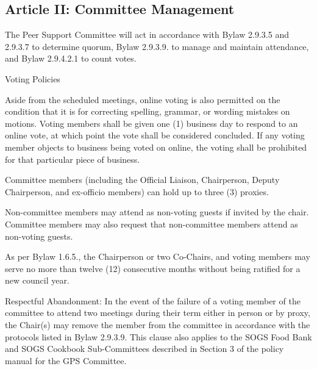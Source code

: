 \subsection{Article II: Committee Management}
\begin{longenum}[ label*=\thesubsection.\arabic*., align=left] 		
	\item The Peer Support Committee will act in accordance with Bylaw 2.9.3.5 and 2.9.3.7 to determine quorum, Bylaw 2.9.3.9. to manage and maintain attendance, and Bylaw 2.9.4.2.1 to count votes.
	\item Voting Policies
		\begin{longenum}[label*=\arabic*., align=left]
		\item Aside from the scheduled meetings, online voting is also permitted on the condition that it is for correcting spelling, grammar, or wording mistakes on motions. Voting members shall be given one (1) business day to respond to an online vote, at which point the vote shall be considered concluded. If any voting member objects to business being voted on online, the voting shall be prohibited for that particular piece of business.
		\item Committee members (including the Official Liaison, Chairperson, Deputy Chairperson, and ex-officio members) can hold up to three (3) proxies.
		\end{longenum}
	\item Non-committee members may attend as non-voting guests if invited by the chair. Committee members may also request that non-committee members attend as non-voting guests. 
	\item As per Bylaw 1.6.5., the Chairperson or two Co-Chairs, and voting members may serve no more than twelve (12) consecutive months without being ratified for a new council year.
	\item Respectful Abandonment: In the event of the failure of a voting member of the committee to attend two meetings during their term either in person or by proxy, the Chair(s) may remove the member from the committee in accordance with the protocols listed in Bylaw 2.9.3.9. This clause also applies to the SOGS Food Bank and SOGS Cookbook Sub-Committees described in Section 3 of the policy manual for the GPS Committee.
\end{longenum}

